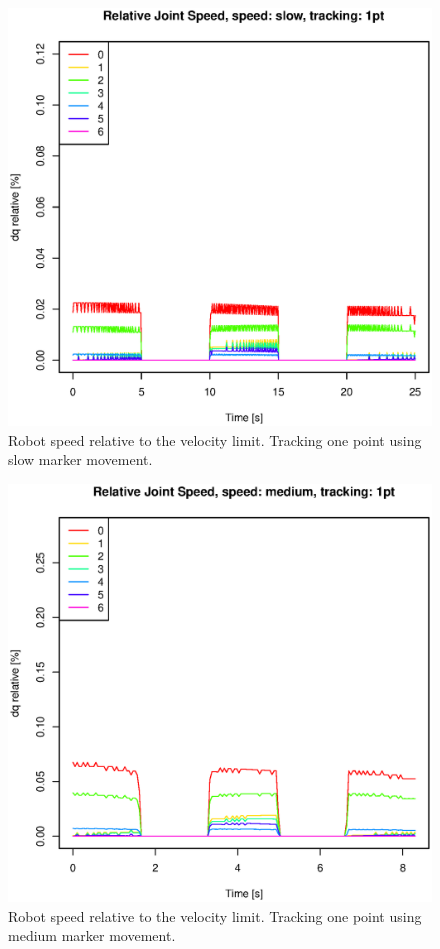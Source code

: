 \begin{figure}[H]
\centering
\includegraphics[width= \linewidth]{graphics/robotics/relativeConfVel_slow_1pt}
\caption{Robot speed relative to the velocity limit. 
Tracking one point using slow marker movement.}
\label{fig:robotspeed_slow_1p}
\end{figure}

\begin{figure}[H]
\centering
\includegraphics[width= \linewidth]{graphics/robotics/relativeConfVel_medium_1pt}
\caption{Robot speed relative to the velocity limit. 
Tracking one point using medium marker movement.}
\label{fig:robotspeed_medium_1p}
\end{figure}

